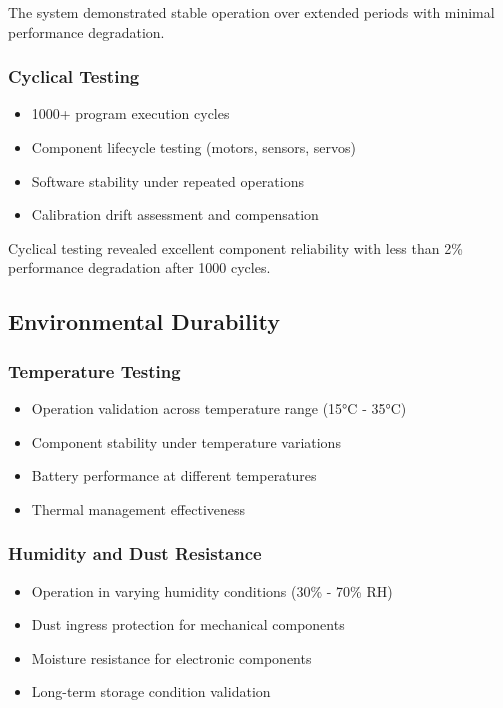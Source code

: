 The system demonstrated stable operation over extended periods with minimal performance degradation.

\subsubsection{Cyclical Testing}
\begin{itemize}
    \item 1000+ program execution cycles
    \item Component lifecycle testing (motors, sensors, servos)
    \item Software stability under repeated operations
    \item Calibration drift assessment and compensation
\end{itemize}

Cyclical testing revealed excellent component reliability with less than 2\% performance degradation after 1000 cycles.

\subsection{Environmental Durability}

\subsubsection{Temperature Testing}
\begin{itemize}
    \item Operation validation across temperature range (15°C - 35°C)
    \item Component stability under temperature variations
    \item Battery performance at different temperatures
    \item Thermal management effectiveness
\end{itemize}

\subsubsection{Humidity and Dust Resistance}
\begin{itemize}
    \item Operation in varying humidity conditions (30\% - 70\% RH)
    \item Dust ingress protection for mechanical components
    \item Moisture resistance for electronic components
    \item Long-term storage condition validation
\end{itemize}

